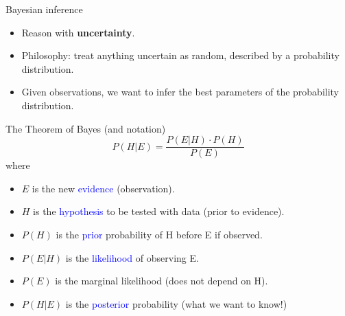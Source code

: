 \documentclass{beamer}
\begin{document}
\begin{frame}{Bayesian inference}

\begin{itemize}
\item Reason with \textbf{uncertainty}.
\bigskip
\item Philosophy: treat anything uncertain as random, described by a probability distribution.
\bigskip
\item Given observations, we want to infer the best parameters of the probability distribution.

\end{itemize}
\end{frame}

\begin{frame}{The Theorem of Bayes (and notation)}
$$
P(H | E) = \frac{P(E | H) \cdot P(H)}{P(E)}
$$
where
\begin{itemize}
\item $E$ is the new \textcolor{blue}{evidence} (observation).
\item $H$ is the \textcolor{blue}{hypothesis} to be tested with data (prior to evidence).
\item $P(H)$ is the \textcolor{blue}{prior} probability of H before E if observed.
\item $P(E | H)$ is the \textcolor{blue}{likelihood} of observing E.
\item $P(E)$ is the marginal likelihood (does not depend on H).
\item $P(H | E)$ is the \textcolor{blue}{posterior} probability (what we want to know!)
\end{itemize}
\end{frame}
\end{document}
